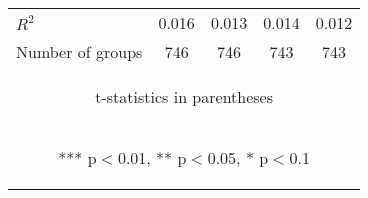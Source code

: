 \documentclass[]{standalone}
\begin{document}
\begin{tabular}{lcccc}
    $R^2$            & 0.016                                          & 0.013                                          & 0.014                                          & 0.012                                          \\
    Number of groups & 746                                            & 746                                            & 743                                            & 743                                            \\ \hline
    \multicolumn{5}{c}{\begin{footnotesize} t-statistics in parentheses\end{footnotesize}}                                                                                                                               \\
    \multicolumn{5}{c}{\begin{footnotesize} *** p$<$0.01, ** p$<$0.05, * p$<$0.1\end{footnotesize}}                                                                                                                      \\
\end{tabular}
\end{document}
